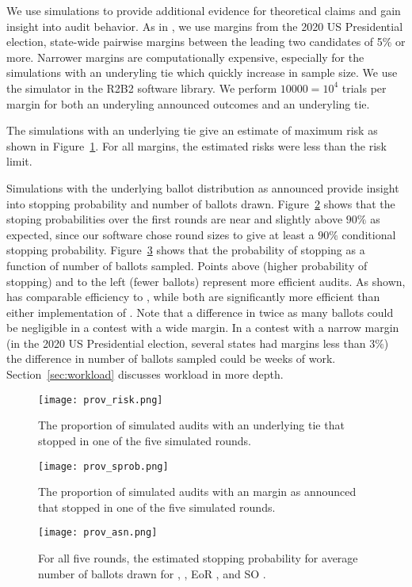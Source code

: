 We use simulations to provide additional evidence for theoretical claims and gain insight into audit behavior. As in \cite{sims}, we use margins from the 2020 US Presidential election, state-wide pairwise margins between the leading two candidates of 5\% or more. Narrower margins are computationally expensive, especially for the simulations with an underyling tie which quickly increase in sample size. We use the simulator in the R2B2 software library\cite{r2b2}. We perform $10000=10^4$ trials per margin for both an underyling announced outcomes and an underyling tie.

The simulations with an underlying tie give an estimate of maximum risk as shown in Figure~\ref{fig:prov-risk}. For all margins, the estimated risks were less than the risk limit.

Simulations with the underlying ballot distribution as announced provide insight into stopping probability and number of ballots drawn. Figure~\ref{fig:prov-sprob} shows that the stoping probabilities over the first rounds are near and slightly above $90\%$ as expected, since our software chose round sizes to give at least a $90\%$ conditional stopping probability.
Figure~\ref{fig:prov-asn} shows that the probability of stopping as a function of number of ballots sampled. Points above (higher probability of stopping) and to the left (fewer ballots) represent more efficient audits. As shown, \Providence has comparable efficiency to \Minerva, while both are significantly more efficient than either implementation of \BRAVO. Note that a difference in twice as many ballots could be negligible in a contest with a wide margin. In a contest with a narrow margin (in the 2020 US Presidential election, several states had margins less than $3\%$) the difference in number of ballots sampled could be weeks of work. Section~\ref{sec:workload} discusses workload in more depth.

\begin{figure}
\texttt{[image: prov\_risk.png]}
\caption{The proportion of simulated audits with an underlying tie that stopped in one of the five simulated rounds.}
\label{fig:prov-risk}
\end{figure}

\begin{figure}
\texttt{[image: prov\_sprob.png]}
\caption{The proportion of simulated audits with an margin as announced that stopped in one of the five simulated rounds.}
\label{fig:prov-sprob}
\end{figure}

\begin{figure}
\texttt{[image: prov\_asn.png]}
\caption{For all five rounds, the estimated stopping probability for average number of ballots drawn for \Providence, \Minerva, EoR \BRAVO, and SO \BRAVO.}
\label{fig:prov-asn}
\end{figure}








